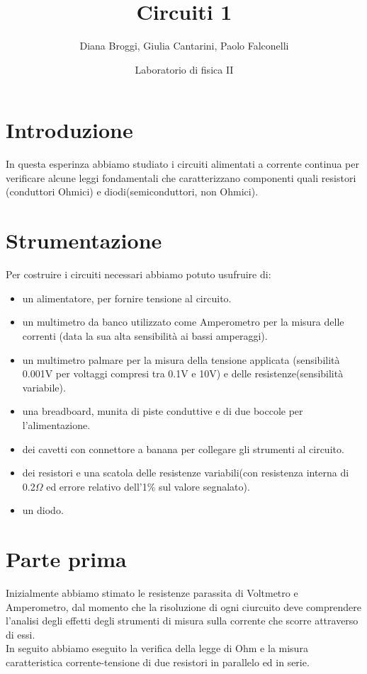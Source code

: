 \documentclass[a4paper]{article}
\title{Circuiti 1}
\date{Laboratorio di fisica II}
\author{Diana Broggi, Giulia Cantarini, Paolo Falconelli}
\theoremstyle{definition}
\begin{document}
\maketitle


\tableofcontents
\pagebreak
\section {Introduzione}
In questa esperinza abbiamo studiato i circuiti alimentati a corrente continua per verificare alcune leggi fondamentali che caratterizzano componenti quali resistori (conduttori Ohmici) e diodi(semiconduttori, non Ohmici).\\

\section{Strumentazione}
Per costruire i circuiti necessari abbiamo potuto usufruire di:
\begin{itemize}
    \item un alimentatore, per fornire tensione al circuito.
    \item un multimetro da banco utilizzato come Amperometro per la misura delle correnti (data la sua alta sensibilità ai bassi amperaggi).
    \item un multimetro palmare per la misura della tensione applicata (sensibilità 0.001V per voltaggi compresi tra 0.1V e 10V) e delle resistenze(sensibilità variabile).
    \item una breadboard, munita di piste conduttive e di due boccole per l'alimentazione.
    \item dei cavetti con connettore a banana per collegare gli strumenti al circuito.
    \item dei resistori e una scatola delle resistenze variabili(con resistenza interna di 0.2\(\Omega\) ed errore relativo dell'1\% sul valore segnalato).
    \item un diodo.
\end{itemize}

\section{Parte prima}

Inizialmente abbiamo stimato le resistenze parassita di Voltmetro e Amperometro, dal momento che la risoluzione di ogni ciurcuito deve comprendere l'analisi degli effetti degli strumenti di misura sulla corrente che scorre attraverso di essi.\\
In seguito abbiamo eseguito la verifica della legge di Ohm e la misura caratteristica corrente-tensione di due resistori in parallelo ed in serie.
\end{document}
